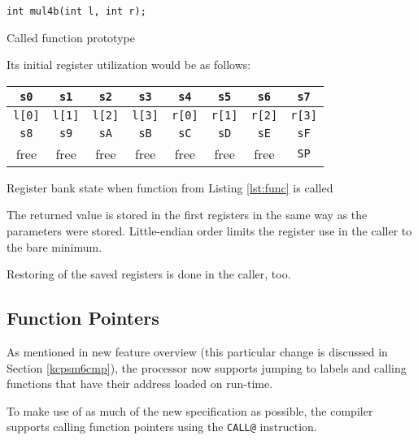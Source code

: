         \begin{listing}
        \centering
        \texttt{int mul4b(int l, int r);}
        \caption{Called function prototype}\label{lst:func}
        \end{listing}

        Its initial register utilization would be as follows:

        \begin{listing}
        \centering
        \begin{tabular}{ | c | c | c | c | c | c | c | c | }
            \hline
            \texttt{s0} & \texttt{s1} & \texttt{s2} & \texttt{s3} & \texttt{s4} & \texttt{s5} & \texttt{s6} & \texttt{s7} \\
            \hline
            \texttt{l[0]} & \texttt{l[1]} & \texttt{l[2]} & \texttt{l[3]} & \texttt{r[0]} & \texttt{r[1]} & \texttt{r[2]} & \texttt{r[3]} \\
            \hline
            \hline
            \texttt{s8} & \texttt{s9} & \texttt{sA} & \texttt{sB} & \texttt{sC} & \texttt{sD} & \texttt{sE} & \texttt{sF} \\
            \hline
            free & free & free & free & free & free & free & \texttt{SP} \\
            \hline
        \end{tabular}
        \caption{Register bank state when function from Listing \ref{lst:func} is called}\label{lst:regs}
        \end{listing}

        The returned value is stored in the first registers in the same way as the parameters were stored. Little-endian order limits the register use in the caller to the bare minimum.

        Restoring of the saved registers is done in the caller, too.

        \subsection{Function Pointers}

        As mentioned in new feature overview (this particular change is discussed in Section \ref{kcpsm6cmp}), the processor now supports jumping to labels and calling functions that have their address loaded on run-time.

        To make use of as much of the new specification as possible, the compiler supports calling function pointers using the \texttt{CALL@} instruction.

